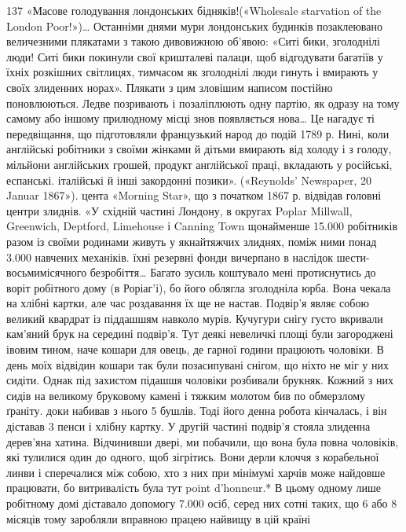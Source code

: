 137 «Масове голодування лондонських бідняків!(«Wholesale starvation
of the London Poor!»)\dots{} Останніми днями мури лондонських будинків
позаклеювано величезними плякатами з такою дивовижною об’явою:
«Ситі бики, зголоднілі люди! Ситі бики покинули свої кришталеві
палаци, щоб відгодувати багатіїв у їхніх розкішних світлицях, тимчасом
як зголоднілі люди гинуть і вмирають у своїх злиденних норах». Плякати
з цим зловішим написом постійно поновлюються. Ледве позривають і
позаліплюють одну партію, як одразу на тому самому або іншому прилюдному
місці знов появляється нова\dots{} Це нагадує ті передвіщання, що підготовляли
французький народ до подій 1789 р. Нині, коли англійські
робітники з своїми жінками й дітьми вмирають від холоду і з голоду,
мільйони англійських грошей, продукт англійської праці, вкладають
у російські, еспанські. італійські й інші закордонні позики». («Reynolds'
Newspaper, 20 Januar 1867»).
цента «Morning Star», що з початком 1867 р. відвідав головні
центри злиднів. «У східній частині Лондону, в округах Poplar
Millwall, Greenwich, Deptford, Limehouse і Canning Town щонайменше
15.000 робітників разом із своїми родинами живуть у
якнайтяжчих злиднях, поміж ними понад 3.000 навчених механіків.
їхні резервні фонди вичерпано в наслідок шести-восьмимісячного
безробіття\dots{} Багато зусиль коштувало мені протиснутись
до воріт робітного дому (в Роріаг’і), бо його облягла зголодніла
юрба. Вона чекала на хлібні картки, але час роздавання
їх ще не настав. Подвір’я являє собою великий квардрат із
піддашшям навколо мурів. Кучугури снігу густо вкривали
кам’яний брук на середині подвір’я. Тут деякі невеличкі площі
були загороджені івовим тином, наче кошари для овець, де гарної
години працюють чоловіки. В день моїх відвідин кошари так
були позасипувані снігом, що ніхто не міг у них сидіти. Однак
під захистом підашшя чоловіки розбивали брукняк. Кожний з
них сидів на великому бруковому камені і тяжким молотом бив
по обмерзлому ґраніту. доки набивав з нього 5 бушлів. Тоді його
денна робота кінчалась, і він діставав 3 пенси і хлібну картку.
У другій частині подвір’я стояла злиденна дерев’яна хатина.
Відчинивши двері, ми побачили, що вона була повна чоловіків,
які тулилися один до одного, щоб зігрітись. Вони дерли клоччя
з корабельної линви і сперечалися між собою, хто з них при мінімумі
харчів може найдовше працювати, бо витривалість була
тут point d’honneur.* В цьому одному лише робітному домі діставало
допомогу 7.000 осіб, серед них сотні таких, що 6 або 8 місяців
тому заробляли вправною працею найвищу в цій країні
